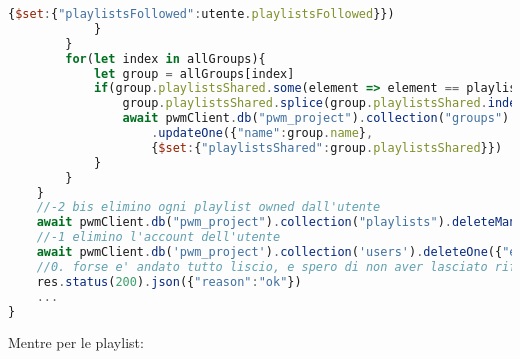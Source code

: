 \begin{lstlisting}[language=JavaScript]
                    {$set:{"playlistsFollowed":utente.playlistsFollowed}})
            }
        }
        for(let index in allGroups){
            let group = allGroups[index]
            if(group.playlistsShared.some(element => element == playlist.name)){
                group.playlistsShared.splice(group.playlistsShared.indexOf(playlist.name),1)
                await pwmClient.db("pwm_project").collection("groups")
                    .updateOne({"name":group.name},
                    {$set:{"playlistsShared":group.playlistsShared}})
            }
        }
    }
    //-2 bis elimino ogni playlist owned dall'utente
    await pwmClient.db("pwm_project").collection("playlists").deleteMany({"owner":utente.userName})
    //-1 elimino l'account dell'utente
    await pwmClient.db('pwm_project').collection('users').deleteOne({"email":decoded.email})
    //0. forse e' andato tutto liscio, e spero di non aver lasciato riferimenti pending da qualche parte
    res.status(200).json({"reason":"ok"}) 
    ...
}
\end{lstlisting}
Mentre per le playlist:
